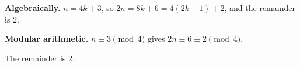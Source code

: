 \textbf{Algebraically.} $n=4k+3$, so $2n=8k+6=4(2k+1)+2$, and the remainder is $2$.

\textbf{Modular arithmetic.} $n\equiv3\pmod4$ gives $2n\equiv6\equiv2\pmod4$.

The remainder is $\boxed{2}$.
